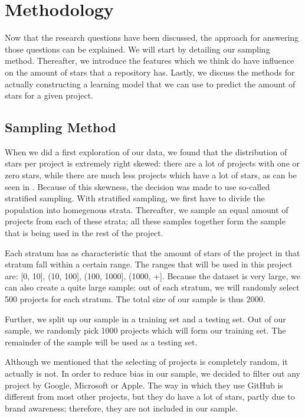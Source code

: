 \section{Methodology}
    Now that the research questions have been discussed, the approach for answering those questions can be explained.
    We will start by detailing our sampling method. 
    Thereafter, we introduce the features which we think do have influence on the amount of stars that a repository has.
    Lastly, we discuss the methods for actually constructing a learning model that we can use to predict the amount of stars for a given project.
    \subsection{Sampling Method}
        When we did a first exploration of our data, we found that the distribution of stars per project is extremely right skewed: there are a lot of projects with one or zero stars, while there are much less projects which have a lot of stars, as can be seen in .
        Because of this skewness, the decision was made to use so-called stratified sampling.
        With stratified sampling, we first have to divide the population into homegenous strata. 
        Thereafter, we sample an equal amount of projects from each of these strata; 
        all these samples together form the sample that is being used in the rest of the project.
        
        Each stratum has as characteristic that the amount of stars of the project in that stratum fall within a certain range. 
        The ranges that will be used in this project are: [0, 10], (10, 100], (100, 1000], (1000, +].
        Because the dataset is very large, we can also create a quite large sample:         
        out of each stratum, we will randomly select 500 projects for each stratum. The total size of our sample is thus 2000.
        
        Further, we split up our sample in a training set and a testing set. Out of our sample, we randomly pick 1000 projects which will form our training set. The remainder of the sample will be used as a testing set.
        
        Although we mentioned that the selecting of projects is completely random, it actually is not. In order to reduce bias in our sample, we decided to filter out any project by Google, Microsoft or Apple.
        The way in which they use GitHub is different from most other projects, but they do have a lot of stars, partly due to brand awareness; therefore, they are not included in our sample.
        

